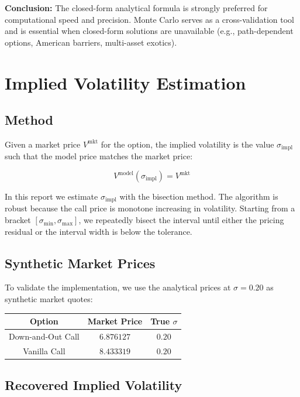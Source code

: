 \documentclass{report}
\begin{document}
\textbf{Conclusion:} The closed-form analytical formula is strongly preferred for computational speed and precision. Monte Carlo serves as a cross-validation tool and is essential when closed-form solutions are unavailable (e.g., path-dependent options, American barriers, multi-asset exotics).

\section{Implied Volatility Estimation}

\subsection{Method}

Given a market price $V^{\text{mkt}}$ for the option, the implied volatility is the value $\sigma_{\text{impl}}$ such that the model price matches the market price:

$$V^{\text{model}}(\sigma_{\text{impl}}) = V^{\text{mkt}}$$

In this report we estimate $\sigma_{\text{impl}}$ with the bisection method. The algorithm is robust because the call price is monotone increasing in volatility. Starting from a bracket $[\sigma_{\min}, \sigma_{\max}]$, we repeatedly bisect the interval until either the pricing residual or the interval width is below the tolerance.

\subsection{Synthetic Market Prices}

To validate the implementation, we use the analytical prices at $\sigma = 0.20$ as synthetic market quotes:

\begin{center}
\begin{tabular}{ccc}
\toprule
Option & Market Price & True $\sigma$ \\
\midrule
Down-and-Out Call & $6.876127$ & $0.20$ \\
Vanilla Call & $8.433319$ & $0.20$ \\
\bottomrule
\end{tabular}
\end{center}

\subsection{Recovered Implied Volatility}
\end{document}
